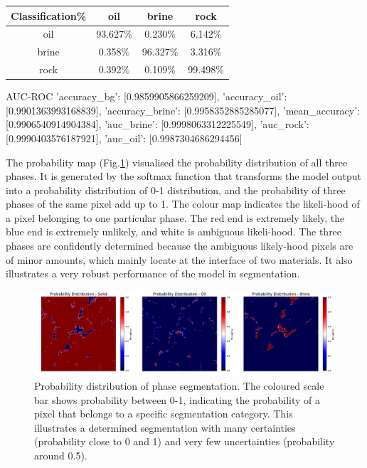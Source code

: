 \documentclass[draft,linenumbers]{agujournal2018}
\begin{document}
\begin{landscape}\label{clsfytable}
\begin{table}[]
\centering
\begin{tabular}{|c|c|c|c|}
\hline
\multicolumn{1}{|r|}{Classification\%} & oil & brine & rock \\ \hline
oil & 93.627\% & 0.230\% & 6.142\% \\ \hline
brine & 0.358\% & 96.327\% & 3.316\% \\ \hline
rock & 0.392\% & 0.109\% & 99.498\% \\ \hline
\end{tabular}
\end{table}
\end{landscape}

AUC-ROC
{'accuracy_bg': [0.9859905866259209], 'accuracy_oil': [0.9901363993168839], 'accuracy_brine': [0.9958352885285077], 'mean_accuracy': [0.9906540914904384], 'auc_brine': [0.9998063312225549], 'auc_rock': [0.9990403576187921], 'auc_oil': [0.9987304686294456]}


The probability map (Fig.\ref{prob}) visualised the probability distribution of all three phases. It is generated by the softmax function that transforms the model output into a probability distribution of 0-1 distribution, and the probability of three phases of the same pixel add up to 1.  The colour map indicates the likeli-hood of a pixel belonging to one particular phase. The red end is extremely likely, the blue end is extremely unlikely, and white is ambiguous likeli-hood. The three phases are confidently determined because the ambiguous likely-hood pixels are of minor amounts, which mainly locate at the interface of two materials. It also illustrates a very robust performance of the model in segmentation. 

\begin{figure}[h]
 \centering
 \includegraphics[width=33pc]{imgs/17_test_probmap.png}
 \caption{Probability distribution of phase segmentation. The coloured scale bar shows probability between 0-1, indicating the probability of a pixel that belongs to a specific segmentation category. This illustrates a determined segmentation with many certainties (probability close to 0 and 1) and very few uncertainties (probability around 0.5).}
 \label{prob}
 \end{figure}
 
\end{document}
